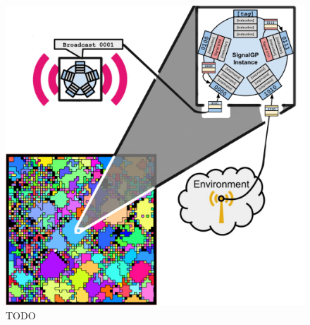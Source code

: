 \begin{figure}
  \centering
  \includegraphics[width=\textwidth]{img/schematic}
  \vspace{-5ex}
  \begin{columns}
  \begin{column}{0.5\textwidth}
  \end{column}
  \begin{column}{0.5\textwidth}
  \caption{
  TODO
  }
  \label{fig:model}
  \end{column}
  \end{columns}
\end{figure}
